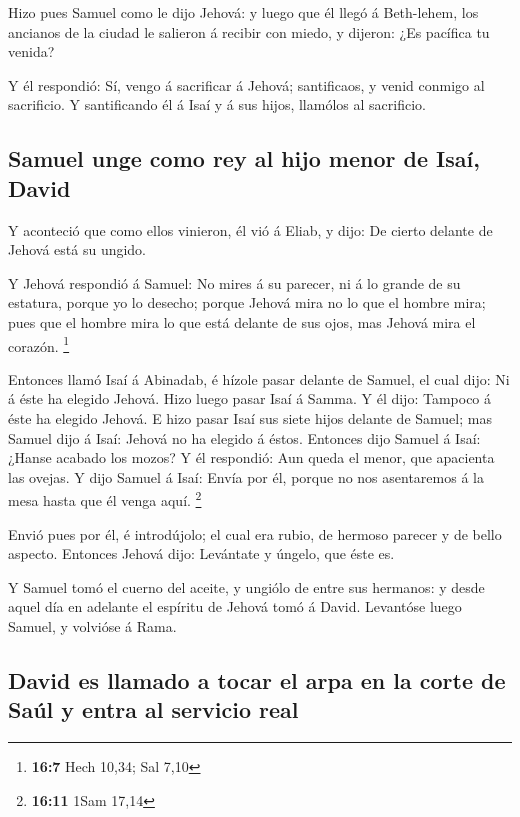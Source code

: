  Hizo pues Samuel como le dijo Jehová: y luego que él
llegó á Beth-lehem, los ancianos de la ciudad le salieron á recibir con
miedo, y dijeron: ¿Es pacífica tu venida?

 Y él respondió: Sí, vengo á sacrificar á Jehová;
santificaos, y venid conmigo al sacrificio. Y santificando él á Isaí y á
sus hijos, llamólos al sacrificio.

\hypertarget{samuel-unge-como-rey-al-hijo-menor-de-isauxed-david}{%
\subsection{Samuel unge como rey al hijo menor de Isaí,
David}\label{samuel-unge-como-rey-al-hijo-menor-de-isauxed-david}}

 Y aconteció que como ellos vinieron, él vió á Eliab, y
dijo: De cierto delante de Jehová está su ungido.

 Y Jehová respondió á Samuel: No mires á su parecer, ni á
lo grande de su estatura, porque yo lo desecho; porque Jehová mira no lo
que el hombre mira; pues que el hombre mira lo que está delante de sus
ojos, mas Jehová mira el corazón. \footnote{\textbf{16:7} Hech 10,34;
  Sal 7,10}

 Entonces llamó Isaí á Abinadab, é hízole pasar delante de
Samuel, el cual dijo: Ni á éste ha elegido Jehová.  Hizo
luego pasar Isaí á Samma. Y él dijo: Tampoco á éste ha elegido Jehová.
 E hizo pasar Isaí sus siete hijos delante de Samuel; mas
Samuel dijo á Isaí: Jehová no ha elegido á éstos. 
Entonces dijo Samuel á Isaí: ¿Hanse acabado los mozos? Y él respondió:
Aun queda el menor, que apacienta las ovejas. Y dijo Samuel á Isaí:
Envía por él, porque no nos asentaremos á la mesa hasta que él venga
aquí. \footnote{\textbf{16:11} 1Sam 17,14}

 Envió pues por él, é introdújolo; el cual era rubio, de
hermoso parecer y de bello aspecto. Entonces Jehová dijo: Levántate y
úngelo, que éste es.

 Y Samuel tomó el cuerno del aceite, y ungiólo de entre
sus hermanos: y desde aquel día en adelante el espíritu de Jehová tomó á
David. Levantóse luego Samuel, y volvióse á Rama.

\hypertarget{david-es-llamado-a-tocar-el-arpa-en-la-corte-de-sauxfal-y-entra-al-servicio-real}{%
\subsection{David es llamado a tocar el arpa en la corte de Saúl y entra
al servicio
real}\label{david-es-llamado-a-tocar-el-arpa-en-la-corte-de-sauxfal-y-entra-al-servicio-real}}

